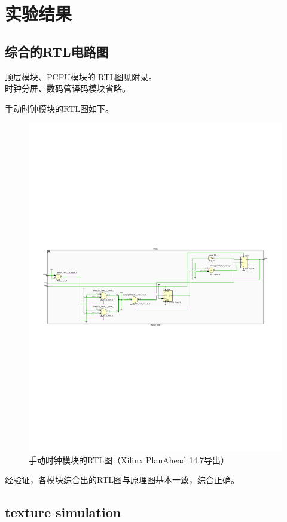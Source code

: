\documentclass[10pt,a4paper,fleqn]{article}
\begin{document}
  \section{实验结果}
\subsection{综合的RTL电路图}
顶层模块、PCPU模块的 RTL图见附录。\\
时钟分屏、数码管译码模块省略。
\par 手动时钟模块的RTL图如下。
\begin{figure}[H]
  \hspace{-1.5cm}
  \includegraphics[width=1.2\textwidth]{figure/manualclock.pdf}
  \caption{手动时钟模块的RTL图（Xilinx PlanAhead 14.7导出）}
\end{figure}
\par 经验证，各模块综合出的RTL图与原理图基本一致，综合正确。

\subsection{texture simulation}
\end{document}

